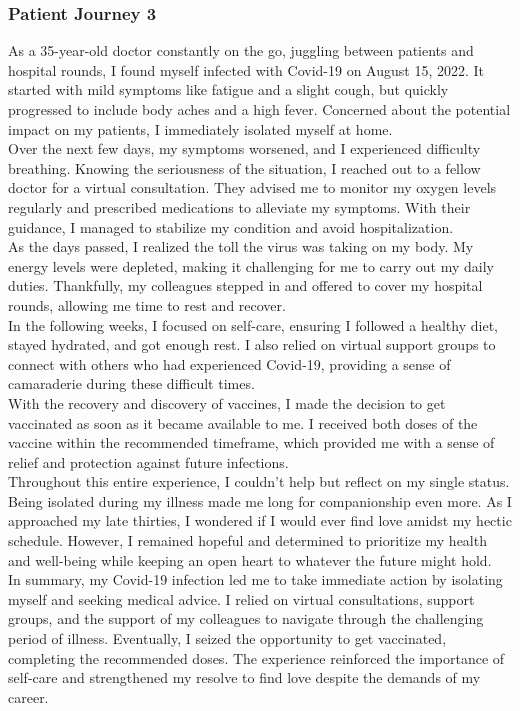 \subsubsection{Patient Journey 3}\label{apx:pj3}
As a 35-year-old doctor constantly on the go, juggling between patients and hospital rounds, I found myself infected with Covid-19 on August 15, 2022. It started with mild symptoms like fatigue and a slight cough, but quickly progressed to include body aches and a high fever. Concerned about the potential impact on my patients, I immediately isolated myself at home.\\
Over the next few days, my symptoms worsened, and I experienced difficulty breathing. Knowing the seriousness of the situation, I reached out to a fellow doctor for a virtual consultation. They advised me to monitor my oxygen levels regularly and prescribed medications to alleviate my symptoms. With their guidance, I managed to stabilize my condition and avoid hospitalization.\\
As the days passed, I realized the toll the virus was taking on my body. My energy levels were depleted, making it challenging for me to carry out my daily duties. Thankfully, my colleagues stepped in and offered to cover my hospital rounds, allowing me time to rest and recover.\\
In the following weeks, I focused on self-care, ensuring I followed a healthy diet, stayed hydrated, and got enough rest. I also relied on virtual support groups to connect with others who had experienced Covid-19, providing a sense of camaraderie during these difficult times.\\
With the recovery and discovery of vaccines, I made the decision to get vaccinated as soon as it became available to me. I received both doses of the vaccine within the recommended timeframe, which provided me with a sense of relief and protection against future infections.\\
Throughout this entire experience, I couldn't help but reflect on my single status. Being isolated during my illness made me long for companionship even more. As I approached my late thirties, I wondered if I would ever find love amidst my hectic schedule. However, I remained hopeful and determined to prioritize my health and well-being while keeping an open heart to whatever the future might hold.\\
In summary, my Covid-19 infection led me to take immediate action by isolating myself and seeking medical advice. I relied on virtual consultations, support groups, and the support of my colleagues to navigate through the challenging period of illness. Eventually, I seized the opportunity to get vaccinated, completing the recommended doses. The experience reinforced the importance of self-care and strengthened my resolve to find love despite the demands of my career.
